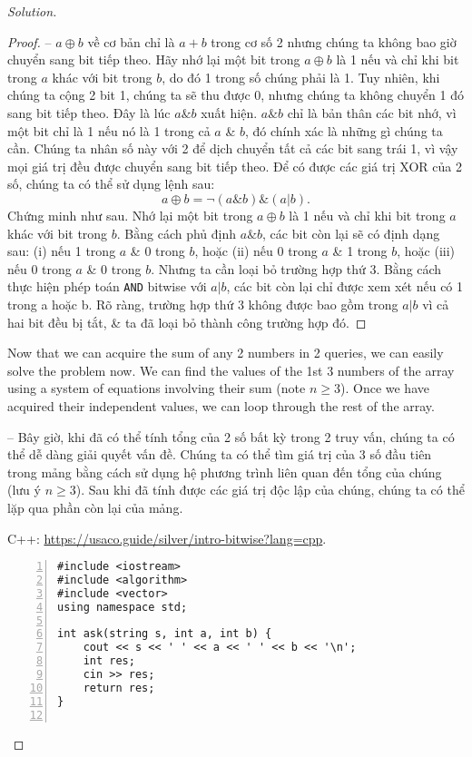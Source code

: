 \documentclass{article}
\begin{document}
\begin{proof}[Solution]
\begin{proof}[Proof]
        -- $a\oplus b$ về cơ bản chỉ là $a + b$ trong cơ số 2 nhưng chúng ta không bao giờ chuyển sang bit tiếp theo. Hãy nhớ lại một bit trong $a\oplus b$ là 1 nếu và chỉ khi bit trong $a$ khác với bit trong $b$, do đó 1 trong số chúng phải là 1. Tuy nhiên, khi chúng ta cộng 2 bit 1, chúng ta sẽ thu được 0, nhưng chúng ta không chuyển 1 đó sang bit tiếp theo. Đây là lúc $a\&b$ xuất hiện. $a\&b$ chỉ là bản thân các bit nhớ, vì một bit chỉ là 1 nếu nó là 1 trong cả $a$ \& $b$, đó chính xác là những gì chúng ta cần. Chúng ta nhân số này với 2 để dịch chuyển tất cả các bit sang trái 1, vì vậy mọi giá trị đều được chuyển sang bit tiếp theo. Để có được các giá trị XOR của 2 số, chúng ta có thể sử dụng lệnh sau:
        \begin{equation*}
            a\oplus b = \neg(a\&b)\&(a|b).
        \end{equation*}
        Chứng minh như sau. Nhớ lại một bit trong $a\oplus b$ là 1 nếu và chỉ khi bit trong $a$ khác với bit trong $b$. Bằng cách phủ định $a\&b$, các bit còn lại sẽ có định dạng sau: (i) nếu 1 trong $a$ \& 0 trong $b$, hoặc (ii) nếu 0 trong $a$ \& 1 trong $b$, hoặc (iii) nếu 0 trong $a$ \& 0 trong $b$. Nhưng ta cần loại bỏ trường hợp thứ 3. Bằng cách thực hiện phép toán {\tt AND} bitwise với $a|b$, các bit còn lại chỉ được xem xét nếu có 1 trong a hoặc b. Rõ ràng, trường hợp thứ 3 không được bao gồm trong $a|b$ vì cả hai bit đều bị tắt, \& ta đã loại bỏ thành công trường hợp đó.
    \end{proof}
    Now that we can acquire the sum of any 2 numbers in 2 queries, we can easily solve the problem now. We can find the values of the 1st 3 numbers of the array using a system of equations involving their sum (note $n\ge3$). Once we have acquired their independent values, we can loop through the rest of the array.

    -- Bây giờ, khi đã có thể tính tổng của 2 số bất kỳ trong 2 truy vấn, chúng ta có thể dễ dàng giải quyết vấn đề. Chúng ta có thể tìm giá trị của 3 số đầu tiên trong mảng bằng cách sử dụng hệ phương trình liên quan đến tổng của chúng (lưu ý $n\ge3$). Sau khi đã tính được các giá trị độc lập của chúng, chúng ta có thể lặp qua phần còn lại của mảng.

    C++: \url{https://usaco.guide/silver/intro-bitwise?lang=cpp}.
    \begin{Verbatim}[numbers=left,xleftmargin=5mm]
#include <iostream>
#include <algorithm>
#include <vector>
using namespace std;

int ask(string s, int a, int b) {
    cout << s << ' ' << a << ' ' << b << '\n';
    int res;
    cin >> res;
    return res;
}


\end{Verbatim}
\end{proof}
\end{document}

